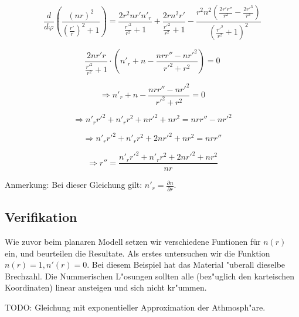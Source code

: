 $$\frac{d}{d\varphi}\left(\frac{(n r)^2}{\left(\frac{r'}{r}\right)^2 + 1}\right) =  \frac{2 r^2 n r' n'_r}{\frac{r'^2}{r^2}+1}+\frac{2 r n^2 r'}{\frac{r'^2}{r^2}+1}-\frac{r^2 n^2 \left(\frac{2 r' r''}{r^2}-\frac{2 r'^3}{r^3}\right)}{\left(\frac{r'^2}{r^2}+1\right)^2}$$

$$\frac{2n r' r}{\frac{r'^2}{r^2}+1} \cdot \left( n'_r + n - \frac{n r r'' - n r'^2}{r'^2 + r^2} \right) = 0$$

\begin{equation} \label{eq:sphere_origin}
\Rightarrow n'_r + n - \frac{n r r'' - n r'^2}{r'^2 + r^2} = 0
\end{equation}

$$\Rightarrow n'_r r'^2  + n'_r r^2 + n r'^2 + nr^2 = n r r'' - n r'^2$$

$$\Rightarrow n'_r r'^2 + n'_r r^2 + 2 n r'^2 + n r^2 = n r r''$$

\begin{equation} \label{eq:sphere_allg}
\Rightarrow r'' = \frac{n'_r r'^2 + n'_r r^2 + 2 n r'^2 + n r^2}{n r}
\end{equation}

Anmerkung: Bei dieser Gleichung gilt: $n'_r = \frac{\partial n}{\partial r}$. 

\subsection{Verifikation}
Wie zuvor beim planaren Modell setzen wir verschiedene Funtionen für $n(r)$ ein, und beurteilen die Resultate. 
Als erstes untersuchen wir die Funktion $n(r) = 1, n'(r) = 0$. 
Bei diesem Beispiel hat das Material "uberall dieselbe Brechzahl.
Die Nummerischen L"osungen sollten alle (bez"uglich den karteischen Koordinaten) linear ansteigen und sich nicht kr"ummen. 

TODO: Gleichung mit exponentieller Approximation der Athmosph"are.


